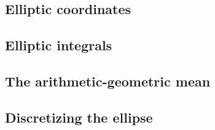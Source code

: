 \subsection{Elliptic coordinates}


\subsection{Elliptic integrals}


\subsection{The arithmetic-geometric mean}


\subsection{Discretizing the ellipse}

